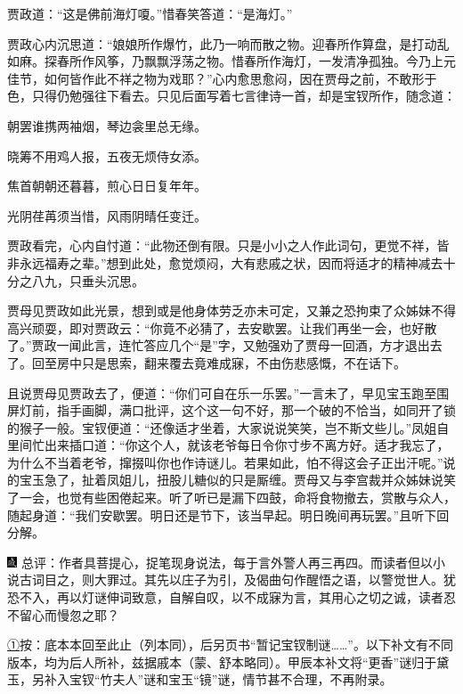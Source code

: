 贾政道：``这是佛前海灯嗄。''惜春笑答道：``是海灯。''

贾政心内沉思道：``娘娘所作爆竹，此乃一响而散之物。迎春所作算盘，是打动乱如麻。探春所作风筝，乃飘飘浮荡之物。惜春所作海灯，一发清净孤独。今乃上元佳节，如何皆作此不祥之物为戏耶？''心内愈思愈闷，因在贾母之前，不敢形于色，只得仍勉强往下看去。只见后面写着七言律诗一首，却是宝钗所作，随念道：

朝罢谁携两袖烟，琴边衾里总无缘。

晓筹不用鸡人报，五夜无烦侍女添。

焦首朝朝还暮暮，煎心日日复年年。

光阴荏苒须当惜，风雨阴晴任变迁。

贾政看完，心内自忖道：``此物还倒有限。只是小小之人作此词句，更觉不祥，皆非永远福寿之辈。''想到此处，愈觉烦闷，大有悲戚之状，因而将适才的精神减去十分之八九，只垂头沉思。

贾母见贾政如此光景，想到或是他身体劳乏亦未可定，又兼之恐拘束了众姊妹不得高兴顽耍，即对贾政云：``你竟不必猜了，去安歇罢。让我们再坐一会，也好散了。''贾政一闻此言，连忙答应几个``是''字，又勉强劝了贾母一回酒，方才退出去了。回至房中只是思索，翻来覆去竟难成寐，不由伤悲感慨，不在话下。

且说贾母见贾政去了，便道：``你们可自在乐一乐罢。''一言未了，早见宝玉跑至围屏灯前，指手画脚，满口批评，这个这一句不好，那一个破的不恰当，如同开了锁的猴子一般。宝钗便道：``还像适才坐着，大家说说笑笑，岂不斯文些儿。''凤姐自里间忙出来插口道：``你这个人，就该老爷每日令你寸步不离方好。适才我忘了，为什么不当着老爷，撺掇叫你也作诗谜儿。若果如此，怕不得这会子正出汗呢。''说的宝玉急了，扯着凤姐儿，扭股儿糖似的只是厮缠。贾母又与李宫裁并众姊妹说笑了一会，也觉有些困倦起来。听了听已是漏下四鼓，命将食物撤去，赏散与众人，随起身道：``我们安歇罢。明日还是节下，该当早起。明日晚间再玩罢。''且听下回分解。

{\includegraphics[width=3mm]{../Images/00005}  \kaishu 总评：作者具菩提心，捉笔现身说法，每于言外警人再三再四。而读者但以小说古词目之，则大罪过。其先以庄子为引，及偈曲句作醒悟之语，以警觉世人。犹恐不入，再以灯谜伸词致意，自解自叹，以不成寐为言，其用心之切之诚，读者忍不留心而慢忽之耶？}




{\href{../Text/part0026_split_000.html\#navto_1_a}{①}按：底本本回至此止（列本同），后另页书``暂记宝钗制谜\ldots{}\ldots{}''。以下补文有不同版本，均为后人所补，兹据戚本（蒙、舒本略同）。甲辰本补文将``更香''谜归于黛玉，另补入宝钗``竹夫人''谜和宝玉``镜''谜，情节甚不合理，不再附录。}
